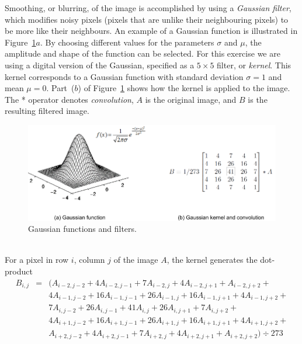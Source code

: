 \documentclass[epsfig,10pt,fullpage]{article}
\begin{document}
\noindent
Smoothing, or blurring, of the image is accomplished by using a {\it Gaussian filter}, which 
modifies noisy pixels (pixels that are unlike their neighbouring pixels) to be more like 
their neighbours. An example of a Gaussian function is illustrated in Figure~\ref{fig:gaussian}$a$.
By choosing different values for the parameters $\sigma$ and $\mu$, the amplitude and shape of the 
function can be selected. For this exercise we are using a digital version of the Gaussian, 
specified as a $5 \times 5$ filter, or {\it kernel}. This kernel corresponds to a Gaussian function
with standard deviation $\sigma = 1$ and mean $\mu = 0$. Part~($b$) of Figure~\ref{fig:gaussian}
shows how the kernel is applied to the image. The * operator denotes {\it convolution}, $A$ is 
the original image, and $B$ is the resulting filtered image.

\begin{figure}[h]
   \begin{center}
       \includegraphics[scale = 0.85]{figures/gaussian.pdf}
   \end{center}
   \caption{Gaussian functions and filters.}
	\label{fig:gaussian}
\end{figure}


~\\
\noindent
For a pixel in row $i$, column $j$ of the image $A$, the kernel generates the dot-product
\begin{eqnarray*}
    B_{i, j}&=& (A_{i-2, j-2} + 4 A_{i-2, j-1} + 7 A_{i-2, j} + 4 A_{i-2, j+1} + A_{i-2, j+2} +\\
    &&4 A_{i-1, j-2} + 16 A_{i-1, j-1} + 26 A_{i-1, j} + 16 A_{i-1, j+1} + 4 A_{i-1, j+2} +\\
    &&7 A_{i, j-2} + 26 A_{i, j-1} + 41 A_{i, j} + 26 A_{i, j+1} + 7 A_{i, j+2} +\\
    &&4 A_{i+1, j-2} + 16 A_{i+1, j-1} + 26 A_{i+1, j} + 16 A_{i+1, j+1} + 4 A_{i+1, j+2} +\\
    &&A_{i+2, j-2} + 4 A_{i+2, j-1} + 7 A_{i+2, j} + 4 A_{i+2, j+1} + A_{i+2, j+2}) \div 273
\end{eqnarray*}
\end{document}
